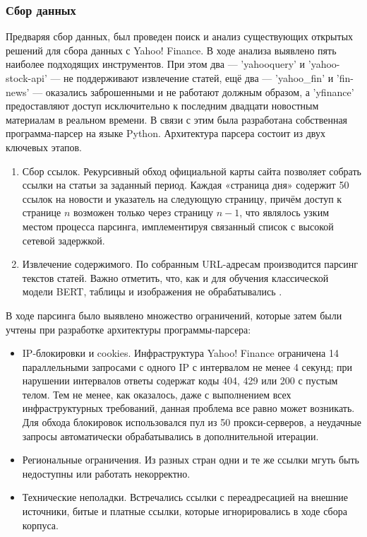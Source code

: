 \subsubsection{Сбор данных}
\label{sec:data_collecting}

Предваряя сбор данных, был проведен поиск и анализ существующих открытых решений для сбора данных
с Yahoo! Finance. В ходе анализа выявлено пять наиболее подходящих инструментов. При этом два --- 'yahooquery'
и 'yahoo-stock-api' --- не поддерживают извлечение статей, ещё два --- 'yahoo\_fin' и 'fin-news' --- оказались
заброшенными и не работают должным образом, а 'yfinance' предоставляют доступ исключительно к последним двадцати
новостным материалам в реальном времени. В связи с этим была разработана собственная программа‑парсер на языке Python.
Архитектура парсера состоит из двух ключевых этапов.

\begin{enumerate}
    \item Сбор ссылок. Рекурсивный обход официальной карты сайта позволяет собрать ссылки на статьи за заданный период.
    Каждая «страница дня» содержит 50 ссылок на новости и указатель на следующую страницу, причём доступ к странице $n$
    возможен только через страницу $n-1$, что являлось узким местом процесса парсинга, имплементируя связанный список
    с высокой сетевой задержкой.
    \item Извлечение содержимого. По собранным URL-адресам производится парсинг текстов статей. Важно отметить,
    что, как и для обучения классической модели BERT, таблицы и изображения не обрабатывались \parencite{devlin2019BERT}.
\end{enumerate}

В ходе парсинга было выявлено множество ограничений, которые затем были учтены при разработке архитектуры программы-парсера:

\begin{itemize}
    \item IP-блокировки и cookies. Инфраструктура Yahoo! Finance ограничена 14 параллельными запросами с одного IP
    с интервалом не менее 4 секунд; при нарушении интервалов ответы содержат коды 404, 429 или 200 с пустым телом. Тем не менее,
    как оказалось, даже с выполнением всех инфраструктурных требований, данная проблема все равно может возникать. Для обхода
    блокировок использовался пул из 50 прокси-серверов, а неудачные запросы автоматически обрабатывались в дополнительной итерации.
    \item Региональные ограничения. Из разных стран одни и те же ссылки мгуть быть недоступны или работать некорректно.
    \item Технические неполадки. Встречались ссылки с переадресацией на внешние источники, битые и платные ссылки,
    которые игнорировались в ходе сбора корпуса.
\end{itemize}

